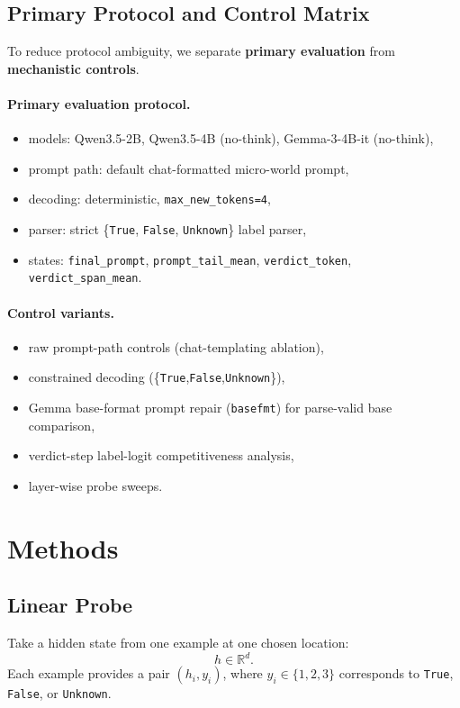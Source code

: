 \documentclass[11pt]{article}
\begin{document}
\subsection{Primary Protocol and Control Matrix}
To reduce protocol ambiguity, we separate \textbf{primary evaluation} from \textbf{mechanistic controls}.

\paragraph{Primary evaluation protocol.}
\begin{itemize}
  \item models: Qwen3.5-2B, Qwen3.5-4B (no-think), Gemma-3-4B-it (no-think),
  \item prompt path: default chat-formatted micro-world prompt,
  \item decoding: deterministic, \texttt{max\_new\_tokens=4},
  \item parser: strict \{\texttt{True}, \texttt{False}, \texttt{Unknown}\} label parser,
  \item states: \texttt{final\_prompt}, \texttt{prompt\_tail\_mean}, \texttt{verdict\_token}, \texttt{verdict\_span\_mean}.
\end{itemize}

\paragraph{Control variants.}
\begin{itemize}
  \item raw prompt-path controls (chat-templating ablation),
  \item constrained decoding (\{\texttt{True},\texttt{False},\texttt{Unknown}\}),
  \item Gemma base-format prompt repair (\texttt{basefmt}) for parse-valid base comparison,
  \item verdict-step label-logit competitiveness analysis,
  \item layer-wise probe sweeps.
\end{itemize}

\section{Methods}
\subsection{Linear Probe}
Take a hidden state from one example at one chosen location:
\[
h \in \mathbb{R}^d.
\]
Each example provides a pair \((h_i, y_i)\), where \(y_i \in \{1,2,3\}\) corresponds to \texttt{True}, \texttt{False}, or \texttt{Unknown}.
\end{document}
